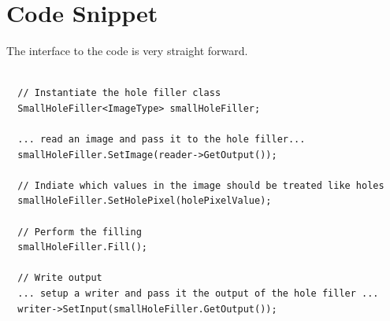 \documentclass{InsightArticle}
\begin{document}
\section{Code Snippet}
The interface to the code is very straight forward.

\begin{verbatim}
  
  // Instantiate the hole filler class 
  SmallHoleFiller<ImageType> smallHoleFiller;

  ... read an image and pass it to the hole filler...
  smallHoleFiller.SetImage(reader->GetOutput());
  
  // Indiate which values in the image should be treated like holes
  smallHoleFiller.SetHolePixel(holePixelValue);
  
  // Perform the filling
  smallHoleFiller.Fill();
  
  // Write output
  ... setup a writer and pass it the output of the hole filler ...
  writer->SetInput(smallHoleFiller.GetOutput());
  
\end{verbatim}

%
\end{document}
